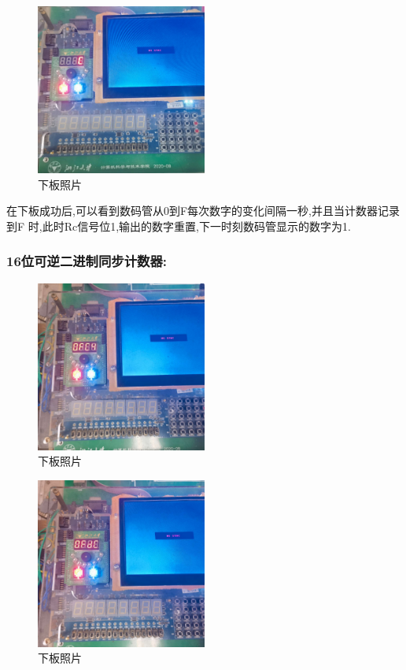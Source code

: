 \documentclass{article}
\begin{document}
    \begin{figure}[H]
    \centering
    \includegraphics[width=0.5\textwidth]{lab10p/6.jpg}
    \caption{\label{Lab10}下板照片}
    \end{figure}
在下板成功后,可以看到数码管从0到F每次数字的变化间隔一秒,并且当计数器记录到F
时,此时Rc信号位1,输出的数字重置,下一时刻数码管显示的数字为1.

\subsubsection*{16位可逆二进制同步计数器:}
\begin{figure}[H]
    \centering
    \includegraphics[width=0.5\textwidth]{lab10p/7.jpg}
    \caption{\label{Lab10}下板照片}
    \end{figure}

    \begin{figure}[H]
    \centering
    \includegraphics[width=0.5\textwidth]{lab10p/8.jpg}
    \caption{\label{Lab10}下板照片}
    \end{figure}
    
\end{document}
